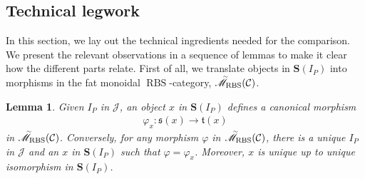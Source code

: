 \documentclass[12pt, reqno]{amsart}
\theoremstyle{plain}
\newtheorem{lemma}[theorem]{Lemma}
\theoremstyle{definition}
\renewcommand{\phi}{\varphi}
\begin{document}
\subsection{Technical legwork}



In this section, we lay out the technical ingredients needed for the comparison. We present the relevant observations in a sequence of lemmas to make it clear how the different parts relate. First of all, we translate objects in $\mathbf{S}(I_P)$ into morphisms in the fat monoidal $\operatorname{RBS}$-category, $\accentset{\sim}{\mathscr{M}}_{\operatorname{RBS}}(\mathcal{C})$.

\begin{lemma}\label{morphism in monoidal category}
Given $I_P$ in $\mathcal{J}$, an object $x$ in $\mathbf{S}(I_P)$ defines a canonical morphism
\begin{align*}
\phi_x\colon \mathfrak{s}(x)\rightarrow \mathfrak{t}(x)
\end{align*}
in $\accentset{\sim}{\mathscr{M}}_{\operatorname{RBS}}(\mathcal{C})$. Conversely, for any morphism $\phi$ in $\accentset{\sim}{\mathscr{M}}_{\operatorname{RBS}}(\mathcal{C})$, there is a unique $I_P$ in $\mathcal{J}$ and an $x$ in $\mathbf{S}(I_P)$ such that $\phi=\phi_x$. Moreover, $x$ is unique up to unique isomorphism in $\mathbf{S}(I_P)$.
\end{lemma}
\end{document}
